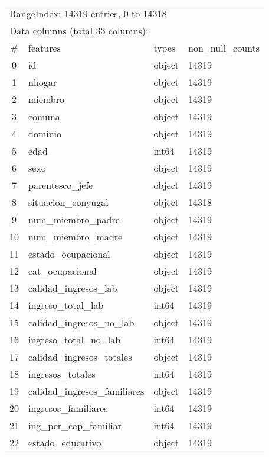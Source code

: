 \documentclass[a4paper]{article}
\begin{document}
    \begin{table}[H]
        \centering
        \begin{tabular}{clll}
            \multicolumn{4}{l}{RangeIndex: 14319 entries, 0 to 14318} \\
            \multicolumn{4}{l}{Data columns (total 33 columns):} \\
            \# & features & types & non\_null\_counts \\ \hline 
            0  & id & object & 14319 \\ 
            1  & nhogar & object & 14319 \\ 
            2  & miembro & object & 14319 \\ 
            3  & comuna & object & 14319 \\ 
            4  & dominio & object & 14319 \\ 
            5  & edad & int64 & 14319 \\ 
            6  & sexo & object & 14319 \\ 
            7  & parentesco\_jefe & object & 14319 \\ 
            8  & situacion\_conyugal & object & 14318 \\ 
            9  & num\_miembro\_padre & object & 14319 \\ 
            10  & num\_miembro\_madre & object & 14319 \\ 
            11  & estado\_ocupacional & object & 14319 \\ 
            12  & cat\_ocupacional & object & 14319 \\ 
            13  & calidad\_ingresos\_lab & object & 14319 \\ 
            14  & ingreso\_total\_lab & int64 & 14319 \\ 
            15  & calidad\_ingresos\_no\_lab & object & 14319 \\ 
            16  & ingreso\_total\_no\_lab & int64 & 14319 \\ 
            17  & calidad\_ingresos\_totales & object & 14319 \\ 
            18  & ingresos\_totales & int64 & 14319 \\ 
            19  & calidad\_ingresos\_familiares & object & 14319 \\ 
            20  & ingresos\_familiares & int64 & 14319 \\ 
            21  & ing\_per\_cap\_familiar & int64 & 14319 \\ 
            22  & estado\_educativo & object & 14319 \\ 

\end{tabular}
\end{table}
\end{document}
